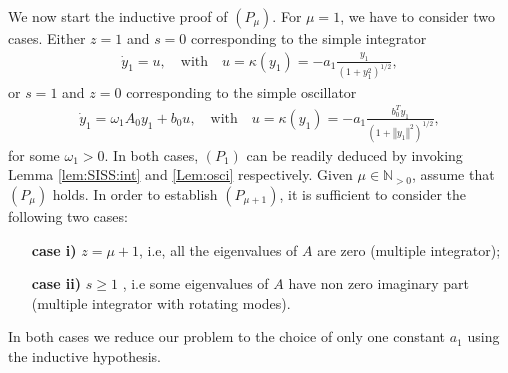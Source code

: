 \documentclass[letterpaper, 10pt]{article}
\newcommand{\norme}[1]{\left\Vert #1\right\Vert}
\newcommand{\entiers}{\mathbb{N}}
\begin{document}
We now start the inductive proof of $(P_{\mu})$. For $\mu=1$, we have to consider two cases. Either $z=1$ and $s=0$ corresponding to the simple integrator
\begin{eqnarray}
\dot{y}_1 = u, \quad \text{with} \quad  u=\kappa(y_1) = - a_1 \frac{y_1}{( 1 + y_1^2)^{1/2}},
\end{eqnarray} or $s=1$ and $z=0$ corresponding to the simple oscillator 
\begin{eqnarray}
\dot{y}_1 = \omega_1 A_0 y_1 + b_0 u,  \quad \text{with} \quad u=\kappa(y_1) = - a_1 \frac{b_0^T y_1}{( 1 + \norme{y_1}^2)^{1/2}},
\end{eqnarray}for some $\omega_1 >0$.
In both cases, $(P_1)$ can be readily deduced by invoking Lemma \ref{lem:SISS:int} and \ref{Lem:osci} respectively. Given $\mu \in \entiers_{>0}$, assume that $(P_\mu)$ holds. In order to establish $(P_{\mu+1})$, it is sufficient to consider the following two cases:
\begin{itemize}
\item[{\bf case i)}] $z = \mu + 1$, i.e, all the eigenvalues of $A$ are zero (multiple integrator);
\item[{\bf case ii)}] $s \geq 1$ , i.e some eigenvalues of $A$ have non zero imaginary part (multiple integrator with rotating modes).
\end{itemize} In both cases we reduce our problem to the choice of only one constant $a_1$ using the inductive hypothesis.
\end{document}
